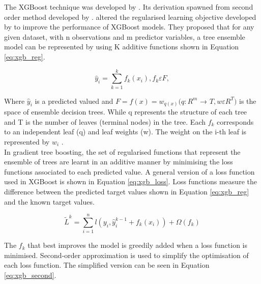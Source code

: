 \vspace{10 pt}

The XGBoost technique was developed by \textcite{XGBoost}. Its derivation spawned from second order method developed by \textcite{Boosting}. \textcite{XGBoost} altered the regularised learning objective developed by \textcite{Boosting} to improve the performance of XGBoost models. They proposed that for any given dataset, with n observations and m predictor variables, a tree ensemble model can be represented by using K additive functions  shown in Equation \ref{eq:xgb_reg}. 

\vspace{10pt}

\begin{equation} \label{eq:xgb_reg}
\hat{y}_{i} = \sum_{k=1}^{k}f_{k}(x_{i}), f_{k} \varepsilon F,
\end{equation}

\vspace{10pt}


Where $\hat{y}_{i}$ is a predicted valued and $F = {f(x) = w_{q(x)}}(q : R^{m}$ → $T, w \varepsilon R^{T})$ is the space of ensemble decision trees. While q represents the structure of each tree and T is the number of leaves (terminal nodes) in the tree. Each $f_k$ corresponds to an independent leaf (q) and leaf weights (w). The weight on the i-th leaf is represented by $w_i$ \parencite{XGBoost}. \\

In gradient tree boosting, the set of regularised functions that represent the ensemble of trees are learnt in an additive manner by minimising the loss functions associated to each predicted value. A general version of a loss function used in XGBoost is shown in Equation \ref{eq:xgb_loss}. Loss functions measure the difference between the predicted target values shown in Equation \ref{eq:xgb_reg} and the known target values. 

\vspace{10pt}

\begin{equation} \label{eq:xgb_loss}
\tilde{L}^{k} = \sum_{i=1}^{n}l(y_i,\hat{y}_{i}^{k-1} + f_k(x_i))+ \Omega(f_k)
\end{equation}

\vspace{10pt}

The $f_k$ that best improves the model is greedily added when a loss function is minimised. Second-order approximation is used to simplify the optimisation of each loss function. The simplified version can be seen in Equation \ref{eq:xgb_second}.

